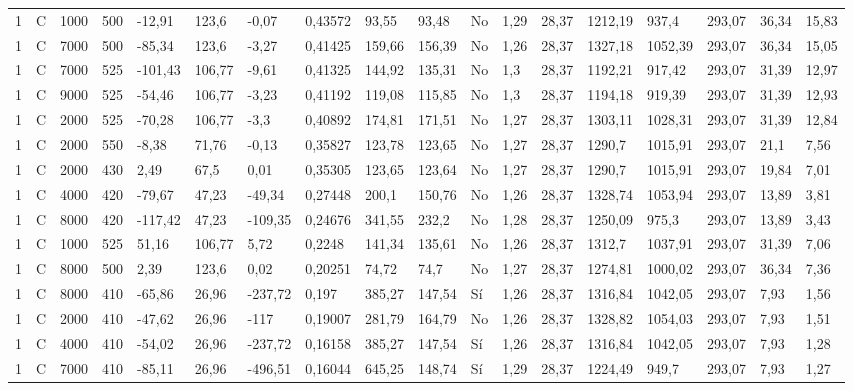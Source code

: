 {\begin{landscape}
\begin{longtable}{llllllllllllllllll}
    1 & C & 1000 & 500 & -12,91 & 123,6 & -0,07 & 0,43572 & 93,55 & 93,48 & No & 1,29 & 28,37 & 1212,19 & 937,4 & 293,07 & 36,34 & 15,83 \\
    1 & C & 7000 & 500 & -85,34 & 123,6 & -3,27 & 0,41425 & 159,66 & 156,39 & No & 1,26 & 28,37 & 1327,18 & 1052,39 & 293,07 & 36,34 & 15,05 \\
    1 & C & 7000 & 525 & -101,43 & 106,77 & -9,61 & 0,41325 & 144,92 & 135,31 & No & 1,3 & 28,37 & 1192,21 & 917,42 & 293,07 & 31,39 & 12,97 \\
    1 & C & 9000 & 525 & -54,46 & 106,77 & -3,23 & 0,41192 & 119,08 & 115,85 & No & 1,3 & 28,37 & 1194,18 & 919,39 & 293,07 & 31,39 & 12,93 \\
    1 & C & 2000 & 525 & -70,28 & 106,77 & -3,3 & 0,40892 & 174,81 & 171,51 & No & 1,27 & 28,37 & 1303,11 & 1028,31 & 293,07 & 31,39 & 12,84 \\
    1 & C & 2000 & 550 & -8,38 & 71,76 & -0,13 & 0,35827 & 123,78 & 123,65 & No & 1,27 & 28,37 & 1290,7 & 1015,91 & 293,07 & 21,1 & 7,56 \\
    1 & C & 2000 & 430 & 2,49 & 67,5 & 0,01 & 0,35305 & 123,65 & 123,64 & No & 1,27 & 28,37 & 1290,7 & 1015,91 & 293,07 & 19,84 & 7,01 \\
    1 & C & 4000 & 420 & -79,67 & 47,23 & -49,34 & 0,27448 & 200,1 & 150,76 & No & 1,26 & 28,37 & 1328,74 & 1053,94 & 293,07 & 13,89 & 3,81 \\
    1 & C & 8000 & 420 & -117,42 & 47,23 & -109,35 & 0,24676 & 341,55 & 232,2 & No & 1,28 & 28,37 & 1250,09 & 975,3 & 293,07 & 13,89 & 3,43 \\
    1 & C & 1000 & 525 & 51,16 & 106,77 & 5,72 & 0,2248 & 141,34 & 135,61 & No & 1,26 & 28,37 & 1312,7 & 1037,91 & 293,07 & 31,39 & 7,06 \\
    1 & C & 8000 & 500 & 2,39 & 123,6 & 0,02 & 0,20251 & 74,72 & 74,7 & No & 1,27 & 28,37 & 1274,81 & 1000,02 & 293,07 & 36,34 & 7,36 \\
    1 & C & 8000 & 410 & -65,86 & 26,96 & -237,72 & 0,197 & 385,27 & 147,54 & Sí & 1,26 & 28,37 & 1316,84 & 1042,05 & 293,07 & 7,93 & 1,56 \\
    1 & C & 2000 & 410 & -47,62 & 26,96 & -117 & 0,19007 & 281,79 & 164,79 & No & 1,26 & 28,37 & 1328,82 & 1054,03 & 293,07 & 7,93 & 1,51 \\
    1 & C & 4000 & 410 & -54,02 & 26,96 & -237,72 & 0,16158 & 385,27 & 147,54 & Sí & 1,26 & 28,37 & 1316,84 & 1042,05 & 293,07 & 7,93 & 1,28 \\
    1 & C & 7000 & 410 & -85,11 & 26,96 & -496,51 & 0,16044 & 645,25 & 148,74 & Sí & 1,29 & 28,37 & 1224,49 & 949,7 & 293,07 & 7,93 & 1,27 \\

\end{longtable}
\end{landscape}}
